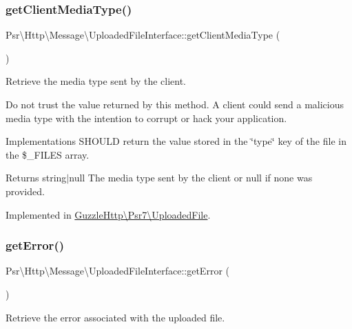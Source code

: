 \subsubsection{\texorpdfstring{get\+Client\+Media\+Type()}{getClientMediaType()}}
{\footnotesize\ttfamily Psr\textbackslash{}\+Http\textbackslash{}\+Message\textbackslash{}\+Uploaded\+File\+Interface\+::get\+Client\+Media\+Type (\begin{DoxyParamCaption}{ }\end{DoxyParamCaption})}

Retrieve the media type sent by the client.

Do not trust the value returned by this method. A client could send a malicious media type with the intention to corrupt or hack your application.

Implementations S\+H\+O\+U\+LD return the value stored in the \char`\"{}type\char`\"{} key of the file in the \$\+\_\+\+F\+I\+L\+ES array.

\begin{DoxyReturn}{Returns}
string$\vert$null The media type sent by the client or null if none was provided. 
\end{DoxyReturn}


Implemented in \hyperlink{classGuzzleHttp_1_1Psr7_1_1UploadedFile_af579a9f2b8a3867da29466cfbad22a4e}{Guzzle\+Http\textbackslash{}\+Psr7\textbackslash{}\+Uploaded\+File}.

\mbox{\label{interfacePsr_1_1Http_1_1Message_1_1UploadedFileInterface_a1c08f48bd2c0b20b37dfadf6f2c992e9}} 
\subsubsection{\texorpdfstring{get\+Error()}{getError()}}
{\footnotesize\ttfamily Psr\textbackslash{}\+Http\textbackslash{}\+Message\textbackslash{}\+Uploaded\+File\+Interface\+::get\+Error (\begin{DoxyParamCaption}{ }\end{DoxyParamCaption})}

Retrieve the error associated with the uploaded file.

